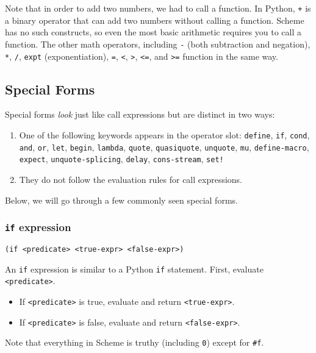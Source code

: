 Note that in order to add two numbers, we had to call a function. In Python, \lstinline{+} is a binary operator that can add two numbers without calling a function. Scheme has no such constructs, so even the most basic arithmetic requires you to call a function. The other math operators, including \lstinline{-} (both subtraction and negation), \lstinline{*}, \lstinline{/}, \lstinline{expt} (exponentiation), \lstinline{=}, \lstinline{<}, \lstinline{>}, \lstinline{<=}, and \lstinline{>=} function in the same way. 

\subsection{Special Forms}

Special forms \textit{look} just like call expressions but are distinct in two ways: 
\begin{enumerate}
    \item One of the following keywords appears in the operator slot: \lstinline{define}, \lstinline{if}, \lstinline{cond}, \lstinline{and}, \lstinline{or}, \lstinline{let}, \lstinline{begin}, \lstinline{lambda}, \lstinline{quote}, \lstinline{quasiquote}, \lstinline{unquote}, \lstinline{mu}, \lstinline{define-macro}, \lstinline{expect}, \lstinline{unquote-splicing}, \lstinline{delay}, \lstinline{cons-stream}, \lstinline{set!}
    \item They do not follow the evaluation rules for call expressions.
\end{enumerate}

Below, we will go through a few commonly seen special forms. 

\subsubsection{\lstinline{if} expression}
\begin{lstlisting}
(if <predicate> <true-expr> <false-expr>)
\end{lstlisting}

An \lstinline{if} expression is similar to a Python \lstinline{if} statement. First, evaluate \lstinline{<predicate>}. 
\begin{itemize}
    \item If \lstinline{<predicate>} is true, evaluate and return \lstinline{<true-expr>}.
    \item If \lstinline{<predicate>} is false, evaluate and return \lstinline{<false-expr>}.
\end{itemize}
Note that everything in Scheme is truthy (including \lstinline{0}) except for \lstinline{#f}. 


